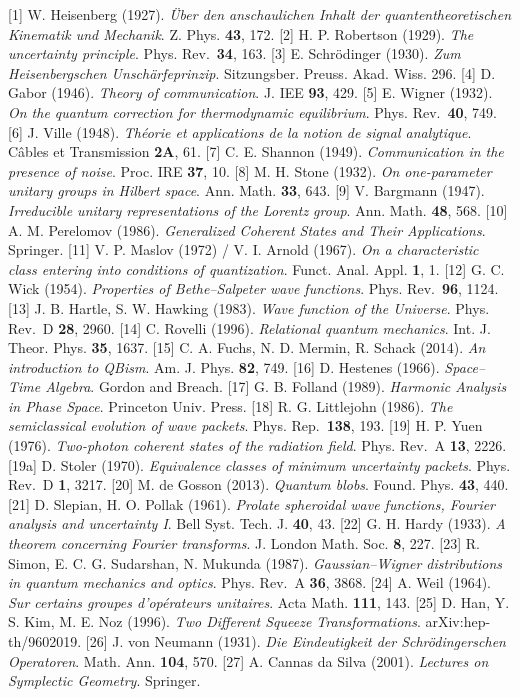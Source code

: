 \documentclass[
]{ltjsarticle}
\begin{document}
{[}1{]} W. Heisenberg (1927). \emph{Über den anschaulichen Inhalt der
quantentheoretischen Kinematik und Mechanik}. Z. Phys. \textbf{43}, 172.
{[}2{]} H. P. Robertson (1929). \emph{The uncertainty principle}. Phys.
Rev.~\textbf{34}, 163. {[}3{]} E. Schrödinger (1930). \emph{Zum
Heisenbergschen Unschärfeprinzip}. Sitzungsber. Preuss. Akad. Wiss. 296.
{[}4{]} D. Gabor (1946). \emph{Theory of communication}. J. IEE
\textbf{93}, 429. {[}5{]} E. Wigner (1932). \emph{On the quantum
correction for thermodynamic equilibrium}. Phys. Rev.~\textbf{40}, 749.
{[}6{]} J. Ville (1948). \emph{Théorie et applications de la notion de
signal analytique}. Câbles et Transmission \textbf{2A}, 61. {[}7{]} C.
E. Shannon (1949). \emph{Communication in the presence of noise}. Proc.
IRE \textbf{37}, 10. {[}8{]} M. H. Stone (1932). \emph{On one-parameter
unitary groups in Hilbert space}. Ann. Math. \textbf{33}, 643. {[}9{]}
V. Bargmann (1947). \emph{Irreducible unitary representations of the
Lorentz group}. Ann. Math. \textbf{48}, 568. {[}10{]} A. M. Perelomov
(1986). \emph{Generalized Coherent States and Their Applications}.
Springer. {[}11{]} V. P. Maslov (1972) / V. I. Arnold (1967). \emph{On a
characteristic class entering into conditions of quantization}. Funct.
Anal. Appl. \textbf{1}, 1. {[}12{]} G. C. Wick (1954). \emph{Properties
of Bethe--Salpeter wave functions}. Phys. Rev.~\textbf{96}, 1124.
{[}13{]} J. B. Hartle, S. W. Hawking (1983). \emph{Wave function of the
Universe}. Phys. Rev.~D \textbf{28}, 2960. {[}14{]} C. Rovelli (1996).
\emph{Relational quantum mechanics}. Int. J. Theor. Phys. \textbf{35},
1637. {[}15{]} C. A. Fuchs, N. D. Mermin, R. Schack (2014). \emph{An
introduction to QBism}. Am. J. Phys. \textbf{82}, 749. {[}16{]} D.
Hestenes (1966). \emph{Space--Time Algebra}. Gordon and Breach. {[}17{]}
G. B. Folland (1989). \emph{Harmonic Analysis in Phase Space}. Princeton
Univ. Press. {[}18{]} R. G. Littlejohn (1986). \emph{The semiclassical
evolution of wave packets}. Phys. Rep.~\textbf{138}, 193. {[}19{]} H. P.
Yuen (1976). \emph{Two-photon coherent states of the radiation field}.
Phys. Rev.~A \textbf{13}, 2226. {[}19a{]} D. Stoler (1970).
\emph{Equivalence classes of minimum uncertainty packets}. Phys. Rev.~D
\textbf{1}, 3217. {[}20{]} M. de Gosson (2013). \emph{Quantum blobs}.
Found. Phys. \textbf{43}, 440. {[}21{]} D. Slepian, H. O. Pollak (1961).
\emph{Prolate spheroidal wave functions, Fourier analysis and
uncertainty I}. Bell Syst. Tech. J. \textbf{40}, 43. {[}22{]} G. H.
Hardy (1933). \emph{A theorem concerning Fourier transforms}. J. London
Math. Soc. \textbf{8}, 227. {[}23{]} R. Simon, E. C. G. Sudarshan, N.
Mukunda (1987). \emph{Gaussian--Wigner distributions in quantum
mechanics and optics}. Phys. Rev.~A \textbf{36}, 3868. {[}24{]} A. Weil
(1964). \emph{Sur certains groupes d'opérateurs unitaires}. Acta Math.
\textbf{111}, 143. {[}25{]} D. Han, Y. S. Kim, M. E. Noz (1996).
\emph{Two Different Squeeze Transformations}. arXiv:hep-th/9602019.
{[}26{]} J. von Neumann (1931). \emph{Die Eindeutigkeit der
Schrödingerschen Operatoren}. Math. Ann. \textbf{104}, 570. {[}27{]} A.
Cannas da Silva (2001). \emph{Lectures on Symplectic Geometry}.
Springer.
\end{document}
